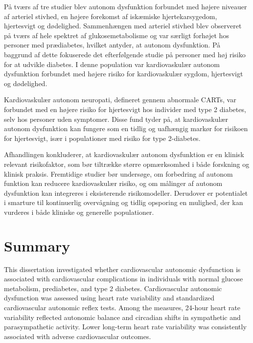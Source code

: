 \documentclass[
  a4paper,
  headsepline=true,
  open=any]{scrbook}
\begin{document}
På tværs af tre studier blev autonom dysfunktion forbundet med højere
niveauer af arteriel stivhed, en højere forekomst af iskæmiske
hjertekarsygedom, hjertesvigt og dødelighed. Sammenhængen med arteriel
stivhed blev observeret på tværs af hele spektret af glukosemetabolisme
og var særligt forhøjet hos personer med prædiabetes, hvilket antyder,
at autonom dysfunktion. På baggrund af dette fokuserede det
efterfølgende studie på personer med høj risiko for at udvikle diabetes.
I denne population var kardiovaskulær autonom dysfunktion forbundet med
højere risiko for kardiovaskulær sygdom, hjertesvigt og dødelighed.

Kardiovaskulær autonom neuropati, defineret gennem abnormale CARTs, var
forbundet med en højere risiko for hjertesvigt hos individer med type 2
diabetes, selv hos personer uden symptomer. Disse fund tyder på, at
kardiovaskulær autonom dysfunktion kan fungere som en tidlig og
uafhængig markør for risikoen for hjertesvigt, især i populationer med
risiko for type 2-diabetes.

Afhandlingen konkluderer, at kardiovaskulær autonom dysfunktion er en
klinisk relevant risikofaktor, som bør tiltrække større opmærksomhed i
både forskning og klinisk praksis. Fremtidige studier bør undersøge, om
forbedring af autonom funktion kan reducere kardiovaskulær risiko, og om
målinger af autonom dysfunktion kan integreres i eksisterende
risikomodeller. Derudover er potentialet i smarture til kontinuerlig
overvågning og tidlig opsporing en mulighed, der kan vurderes i både
kliniske og generelle populationer.

\newpage


\hypertarget{summary}{%
\chapter*{Summary}\label{summary}}


This dissertation investigated whether cardiovascular autonomic
dysfunction is associated with cardiovascular complications in
individuals with normal glucose metabolism, prediabetes, and type 2
diabetes. Cardiovascular autonomic dysfunction was assessed using heart
rate variability and standardized cardiovascular autonomic reflex tests.
Among the measures, 24-hour heart rate variability reflected autonomic
balance and circadian shifts in sympathetic and parasympathetic
activity. Lower long-term heart rate variability was consistently
associated with adverse cardiovascular outcomes.
\end{document}

